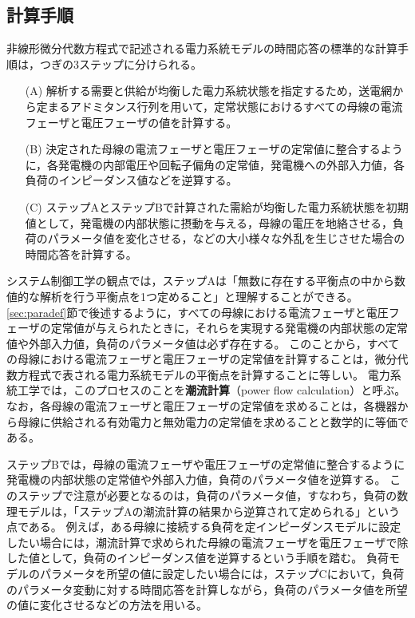 \documentclass[tombow,dvipdfmx]{corona-a5-1.1}
\begin{document}
\subsection{計算手順}\label{sec:numstep}

非線形微分代数方程式で記述される電力系統モデルの時間応答の標準的な計算手順は，つぎの3ステップに分けられる。

\begin{itemize}
\item[(A)] 解析する需要と供給が均衡した電力系統状態を指定するため，送電網から定まるアドミタンス行列を用いて，定常状態におけるすべての母線の電流フェーザと電圧フェーザの値を計算する。
\item[(B)] 決定された母線の電流フェーザと電圧フェーザの定常値に整合するように，各発電機の内部電圧や回転子偏角の定常値，発電機への外部入力値，各負荷のインピーダンス値などを逆算する。
\item[(C)] ステップAとステップBで計算された需給が均衡した電力系統状態を初期値として，発電機の内部状態に摂動を与える，母線の電圧を地絡させる，負荷のパラメータ値を変化させる，などの大小様々な外乱を生じさせた場合の時間応答を計算する。
\end{itemize}

システム制御工学の観点では，ステップAは「無数に存在する平衡点の中から数値的な解析を行う平衡点を1つ定めること」と理解することができる。
\ref{sec:paradef}節で後述するように，すべての母線における電流フェーザと電圧フェーザの定常値が与えられたときに，それらを実現する発電機の内部状態の定常値や外部入力値，負荷のパラメータ値は必ず存在する。
このことから，すべての母線における電流フェーザと電圧フェーザの定常値を計算することは，微分代数方程式で表される電力系統モデルの平衡点を計算することに等しい。
電力系統工学では，このプロセスのことを\textbf{潮流計算}（power flow calculation）と呼ぶ。
なお，各母線の電流フェーザと電圧フェーザの定常値を求めることは，各機器から母線に供給される有効電力と無効電力の定常値を求めることと数学的に等価である。

ステップBでは，母線の電流フェーザや電圧フェーザの定常値に整合するように発電機の内部状態の定常値や外部入力値，負荷のパラメータ値を逆算する。
このステップで注意が必要となるのは，負荷のパラメータ値，すなわち，負荷の数理モデルは，「ステップAの潮流計算の結果から逆算されて定められる」という点である。
例えば，ある母線に接続する負荷を定インピーダンスモデルに設定したい場合には，潮流計算で求められた母線の電流フェーザを電圧フェーザで除した値として，負荷のインピーダンス値を逆算するという手順を踏む。
負荷モデルのパラメータを所望の値に設定したい場合には，ステップCにおいて，負荷のパラメータ変動に対する時間応答を計算しながら，負荷のパラメータ値を所望の値に変化させるなどの方法を用いる。
\end{document}
